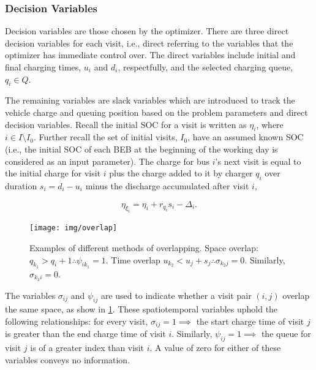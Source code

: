 \documentclass[energies,article,submit,moreauthors]{Definitions/mdpi}
\newcommand{\Iset}{I}                       %
\newcommand{\Qset}{Q}                       %
\begin{document}
\subsubsection{Decision Variables}
\label{sec:sa-decision-variables}
Decision variables are those chosen by the optimizer. There are three direct decision variables for each visit, i.e.,
direct referring to the variables that the optimizer has immediate control over. The direct variables include initial
and final charging times, \(u_i\) and \(d_i\), respectfully, and the selected charging queue, \(q_i \in \Qset\).

The remaining variables are slack variables which are introduced to track the vehicle charge and queuing position based
on the problem parameters and direct decision variables. Recall the initial SOC for a visit is written as \(\eta_i\), where
\(i \in \Iset \setminus \Iset_0\). Further recall the set of initial visits, \(\Iset_0\), have an assumed known SOC (i.e., the initial
SOC of each BEB at the beginning of the working day is considered as an input parameter). The charge for bus \(i\)'s next
visit is equal to the initial charge for visit \(i\) plus the charge added to it by charger \(q_i\) over duration \(s_i =
d_i - u_i\) minus the discharge accumulated after visit \(i\),

\begin{equation}
\label{eq:bat-chain}
  \eta_{\xi_i} = \eta_i + r_{q_i}s_i - \Delta_i\text{.}
\end{equation}

\begin{figure}
    \centering
    \texttt{[image: img/overlap]}
    \caption{Examples of different methods of overlapping. Space overlap: $q_{k_1} > q_{i} + 1 \therefore \psi_{ik_{1}} = 1$.
      Time overlap $u_{k_2} < u_{j} + s_j \therefore \sigma_{k_{2}j} = 0$. Similarly, $\sigma_{k_3 i} = 0$.}
    \label{fig:overlap}
  \end{figure}

The variables \(\sigma_{ij}\) and \(\psi_{ij}\) are used to indicate whether a visit pair \((i, j)\) overlap the same space, as show
in \ref{fig:overlap}. These spatiotemporal variables uphold the following relationships: for every
visit, \(\sigma_{ij} = 1 \implies\) the start charge time of visit \(j\) is greater than the end charge time of visit \(i\).
Similarly, \(\psi_{ij} = 1 \implies\) the queue for visit \(j\) is of a greater index than visit \(i\). A value of zero for
either of these variables conveys no information.
\end{document}
